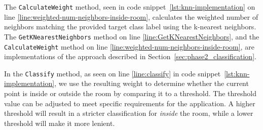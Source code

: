 The \texttt{CalculateWeight} method, seen in code snippet~\ref{lst:knn-implementation} on line \ref{line:weighted-num-neighbors-inside-room}, calculates the weighted number of neighbors matching the provided target class label using the k-nearest neighbors. 
The \texttt{GetKNearestNeighbors} method on line \ref{line:GetKNearestNeighbors}, and the \texttt{CalculateWeight} method on line \ref{line:weighted-num-neighbors-inside-room}, are implementations of the approach described in Section~\ref{sec:phase2_classification}.

In the \texttt{Classify} method, as seen on line \ref{line:classify} in code snippet~\ref{lst:knn-implementation}, we use the resulting weight to determine whether the current point is inside or outside the room by comparing it to a threshold.
The threshold value can be adjusted to meet specific requirements for the application. A higher threshold will result in a stricter classification for \textit{inside} the room, while a lower threshold will make it more lenient.